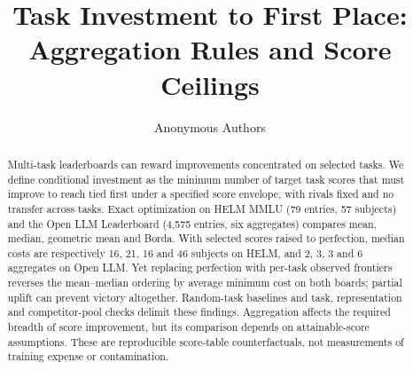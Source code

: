 \documentclass{article}
\title{Task Investment to First Place:\\Aggregation Rules and Score Ceilings}
\author{Anonymous Authors}
\begin{document}
\maketitle
\begin{abstract}
Multi-task leaderboards can reward improvements concentrated on selected tasks. We define conditional investment as the minimum number of target task scores that must improve to reach tied first under a specified score envelope, with rivals fixed and no transfer across tasks. Exact optimization on HELM MMLU (79 entries, 57 subjects) and the Open LLM Leaderboard (4,575 entries, six aggregates) compares mean, median, geometric mean and Borda. With selected scores raised to perfection, median costs are respectively 16, 21, 16 and 46 subjects on HELM, and 2, 3, 3 and 6 aggregates on Open LLM. Yet replacing perfection with per-task observed frontiers reverses the mean--median ordering by average minimum cost on both boards; partial uplift can prevent victory altogether. Random-task baselines and task, representation and competitor-pool checks delimit these findings. Aggregation affects the required breadth of score improvement, but its comparison depends on attainable-score assumptions. These are reproducible score-table counterfactuals, not measurements of training expense or contamination.
\end{abstract}




\clearpage
{\small


}
\clearpage
\appendix

\clearpage

\end{document}
